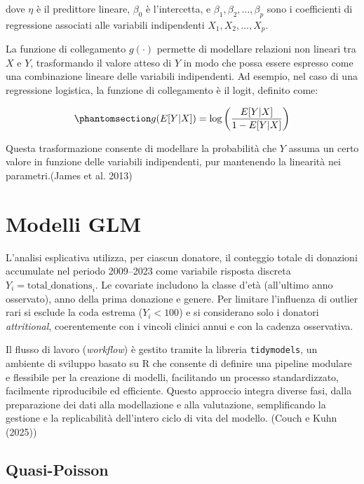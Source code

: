 \documentclass[
  italian,
  a4paper,
  a4paper,
  twoside,
  open=right,
  12pt]{scrbook}
\theoremstyle{definition}
\theoremstyle{remark}
\begin{document}
dove \(\eta\) è il predittore lineare, \(\beta_0\) è l'intercetta, e
\(\beta_1, \beta_2, \ldots, \beta_p\) sono i coefficienti di regressione
associati alle variabili indipendenti \(X_1, X_2, \ldots, X_p\).

La funzione di collegamento \(g(\cdot)\) permette di modellare relazioni
non lineari tra \(X\) e \(Y\), trasformando il valore atteso di \(Y\) in
modo che possa essere espresso come una combinazione lineare delle
variabili indipendenti. Ad esempio, nel caso di una regressione
logistica, la funzione di collegamento è il logit, definito come:

\begin{equation}\phantomsection\label{eq-link_function}{
g(E[Y|X]) = \log\left(\frac{E[Y|X]}{1 - E[Y|X]}\right)
}\end{equation}

Questa trasformazione consente di modellare la probabilità che \(Y\)
assuma un certo valore in funzione delle variabili indipendenti, pur
mantenendo la linearità nei parametri.(James et al. 2013)

\section{Modelli GLM}\label{modelli-glm}

L'analisi esplicativa utilizza, per ciascun donatore, il conteggio
totale di donazioni accumulate nel periodo 2009--2023 come variabile
risposta discreta \(Y_i=\text{total\_donations}_i\). Le covariate
includono la classe d'età (all'ultimo anno osservato), anno della prima
donazione e genere. Per limitare l'influenza di outlier rari si esclude
la coda estrema (\(Y_i<100\)) e si considerano solo i donatori
\emph{attritional}, coerentemente con i vincoli clinici annui e con la
cadenza osservativa.

Il flusso di lavoro (\emph{workflow}) è gestito tramite la libreria
\texttt{tidymodels}, un ambiente di sviluppo basato su R che consente di
definire una pipeline modulare e flessibile per la creazione di modelli,
facilitando un processo standardizzato, facilmente riproducibile ed
efficiente. Questo approccio integra diverse fasi, dalla preparazione
dei dati alla modellazione e alla valutazione, semplificando la gestione
e la replicabilità dell'intero ciclo di vita del modello. (Couch e Kuhn
(2025))

\subsection{Quasi-Poisson}\label{quasi-poisson}
\end{document}
